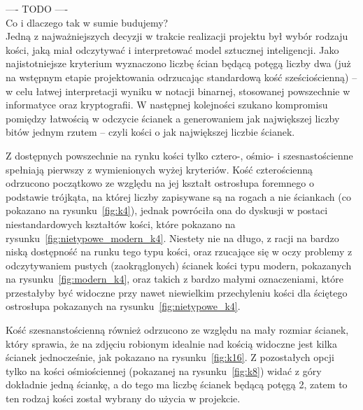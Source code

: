 

---- TODO ---- \\

Co i dlaczego tak w sumie budujemy? \\

Jedną z najważniejszych decyzji w trakcie realizacji projektu był wybór rodzaju kości, jaką miał odczytywać 
i interpretować model sztucznej inteligencji.
Jako najistotniejsze kryterium wyznaczono liczbę ścian będącą potęgą liczby dwa
(już na wstępnym etapie projektowania odrzucając standardową kość sześciościenną) --
w celu łatwej interpretacji wyniku w notacji binarnej, stosowanej powszechnie w informatyce oraz kryptografii.
W następnej kolejności szukano kompromisu pomiędzy łatwością w odczycie ścianek a generowaniem jak największej liczby
bitów jednym rzutem -- czyli kości o jak największej liczbie ścianek.

Z dostępnych powszechnie na rynku kości tylko cztero-, ośmio- i szesnastościenne spełniają pierwszy z wymienionych wyżej kryteriów.
Kość czterościenną odrzucono początkowo ze względu na jej kształt ostrosłupa foremnego o podstawie trójkąta,
na której liczby zapisywane są na rogach a nie ściankach (co pokazano na rysunku~\ref{fig:k4}),
jednak powróciła ona do dyskusji w postaci niestandardowych kształtów kości, które pokazano na rysunku~\ref{fig:nietypowe_modern_k4}.
Niestety nie na długo, z racji na bardzo niską dostępność na runku tego typu kości, oraz rzucające się w oczy problemy
z odczytywaniem pustych (zaokrąglonych) ścianek kości typu modern, pokazanych na rysunku~\ref{fig:modern_k4},
oraz takich z bardzo małymi oznaczeniami, które przestałyby być widoczne przy nawet niewielkim przechyleniu kości
dla ściętego ostrosłupa pokazanych na rysunku~\ref{fig:nietypowe_k4}.

Kość szesnanstościenną również odrzucono ze względu na mały rozmiar ścianek, który sprawia,
że na zdjęciu robionym idealnie nad kością widoczne jest kilka ścianek jednocześnie, jak pokazano na rysunku~\ref{fig:k16}.
Z pozostałych opcji tylko na kości ośmiościennej (pokazanej na rysunku~\ref{fig:k8}) widać z góry dokładnie jedną ściankę,
a do tego ma liczbę ścianek będącą potęgą 2, zatem to ten rodzaj kości został wybrany do użycia w projekcie.

